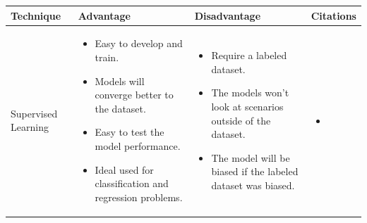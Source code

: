 \begin{longtable}{| p{23mm} | p{46mm} | p{42mm} | p{38mm} |}
\hline
    \textbf{Technique} &
    \textbf{Advantage} &
    \textbf{Disadvantage} &
    \textbf{Citations} \\ \hline
    
    Supervised Learning &
    \vspace{-8mm}
    \begin{itemize}[leftmargin=0mm,noitemsep,nolistsep,label={}] 
        \item Easy to develop and train.
        \item Models will converge better to the dataset.
        \item Easy to test the model performance.
        \item Ideal used for classification and regression problems.
        \vspace{-7mm}
    \end{itemize} &
    \vspace{-8mm}
    \begin{itemize}[leftmargin=0mm,noitemsep,nolistsep,label={}] 
            \item Require a labeled dataset.
            \item The models won’t look at scenarios outside of the dataset. 
            \item The model will be biased if the labeled dataset was biased.
            \vspace{-7mm}
    \end{itemize} &
    \vspace{-8mm}
    \begin{itemize}[leftmargin=0mm,noitemsep,nolistsep,label={}] 
        \item \cite{du2018anomaly}
        \vspace{-7mm}
    \end{itemize} \\ \hline
    

\end{longtable}
